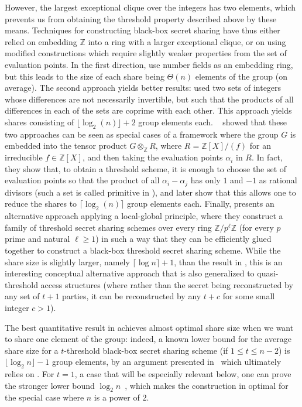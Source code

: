 \documentclass{amsart}
\theoremstyle{plain}
\theoremstyle{definition}
\newcommand{\Z}{\ensuremath{\mathbb{Z}}}
\begin{document}
However, the largest exceptional clique over the integers has two elements, which prevents us from obtaining the threshold property described above by these means. Techniques for constructing black-box secret sharing have thus either relied on embedding $\Z$ into a ring with a larger exceptional clique, or on using modified constructions which require slightly weaker properties from the set of evaluation points. In the first direction, \cite{DF94} use number fields as an embedding ring, but this leads to the size of each share being $\Theta(n)$ elements of the group (on average). The second approach yields better results: \cite{CF02} used two sets of integers whose differences are not necessarily invertible, but such that the products of all differences in each of the sets are coprime with each other. This approach yields shares consisting of $\lfloor \log_2(n) \rfloor +2$ group elements each. ~\cite{CFS05} showed that these two approaches can be seen as special cases of a framework where the group $G$ is embedded into the tensor product $G\otimes_{\Z} R$, where $R=\Z[X]/(f)$ for an irreducible $f\in\Z[X]$, and then taking the evaluation points $\alpha_i$ in $R$. In fact, they show that, to obtain a threshold scheme, it is enough to choose the set of evaluation points so that the product of all $\alpha_i-\alpha_j$ has only $1$ and $-1$ as rational divisors (such a set is called primitive in \cite{CFS05}), and later show that this allows one to reduce the shares to $\lceil \log_2(n)\rceil$ group elements each.
Finally, \cite{CX20} presents an alternative approach applying a local-global principle, where they construct a family of threshold secret sharing schemes over every ring $\Z/{p^\ell}\Z$ (for every $p$ prime and natural $\ell\geq 1$) in such a way that they can be efficiently glued together to construct a black-box threshold secret sharing scheme. While the share size is slightly larger, namely $\lceil \log n\rceil+1$, than the result in \cite{CFS05}, this is an interesting conceptual alternative approach that is also generalized to quasi-threshold access structures (where rather than the secret being reconstructed by any set of $t+1$ parties, it can be reconstructed by any $t+c$ for some small integer $c>1$).

The best quantitative result in \cite{CFS05} achieves almost optimal share size when we want to share one element of the group: indeed, a known lower bound for the average share size for a $t$-threshold black-box secret sharing scheme (if $1\leq t\leq n-2$) is $\lfloor\log_2 n\rfloor-1$ group elements, by an argument presented in~\cite{CF02} which ultimately relies on \cite{KW93}. For $t=1$, a case that will be especially relevant below, one can prove the stronger lower bound $\log_2 n$~\cite{CF02}, which makes the construction in \cite{CFS05} optimal for the special case where $n$ is a power of $2$.
\end{document}
